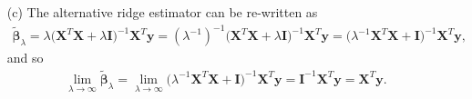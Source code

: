 \documentclass[10pt]{article}
\begin{document}
\begin{itemize}
    \item[(c)] The alternative ridge estimator can be re-written as 
    \begin{align*}
        \tilde{\bm{\beta}}_{\lambda}
        = \lambda \big( \mathbf{X}^T \mathbf{X} + \lambda \mathbf{I} \big)^{-1} \mathbf{X}^T \mathbf{y}
        = (\lambda^{-1})^{-1} \big( \mathbf{X}^T \mathbf{X} + \lambda \mathbf{I} \big)^{-1} \mathbf{X}^T \mathbf{y} 
        = \big( \lambda^{-1} \mathbf{X}^T \mathbf{X} + \mathbf{I} \big)^{-1} \mathbf{X}^T \mathbf{y},
    \end{align*}
    and so 
    \begin{align*}
        \lim_{\lambda \to \infty} \tilde{\bm{\beta}}_{\lambda}
        = \lim_{\lambda \to \infty} \big( \lambda^{-1} \mathbf{X}^T \mathbf{X} + \mathbf{I} \big)^{-1} \mathbf{X}^T \mathbf{y}
        = \mathbf{I}^{-1} \mathbf{X}^T \mathbf{y}
        = \mathbf{X}^T \mathbf{y}.
    \end{align*}
\end{itemize}
\end{document}
